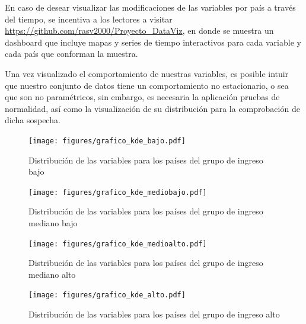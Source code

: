 \documentclass[conference]{IEEEtran}
\begin{document}
En caso de desear visualizar las modificaciones de las variables por país a través del tiempo, se incentiva a los lectores a visitar \url{https://github.com/rasv2000/Proyecto_DataViz}, en donde se muestra un dashboard que incluye mapas y series de tiempo interactivos para cada variable y cada país que conforman la muestra.

Una vez visualizado el comportamiento de nuestras variables, es posible intuir que nuestro conjunto de datos tiene un comportamiento no estacionario, o sea que son no paramétricos, sin embargo, es necesaria la aplicación pruebas de normalidad, así como la visualización de su distribución para la comprobación de dicha sospecha.

\begin{figure}[H]
    \centering
    \texttt{[image: figures/grafico\_kde\_bajo.pdf]}
    \caption{Distribución de las variables para los países del grupo de ingreso bajo}
    \label{fig:KDE_bajo}
\end{figure}

\begin{figure}[H]
    \centering
    \texttt{[image: figures/grafico\_kde\_mediobajo.pdf]}
    \caption{Distribución de las variables para los países del grupo de ingreso mediano bajo}
    \label{fig:KDE_mediobajo}
\end{figure}

\begin{figure}[H]
    \centering
    \texttt{[image: figures/grafico\_kde\_medioalto.pdf]}
    \caption{Distribución de las variables para los países del grupo de ingreso mediano alto}
    \label{fig:KDE_medioalto}
\end{figure}

\begin{figure}[h]
    \centering
    \texttt{[image: figures/grafico\_kde\_alto.pdf]}
    \caption{Distribución de las variables para los países del grupo de ingreso alto}
    \label{fig:KDE_alto}
\end{figure}
\end{document}
